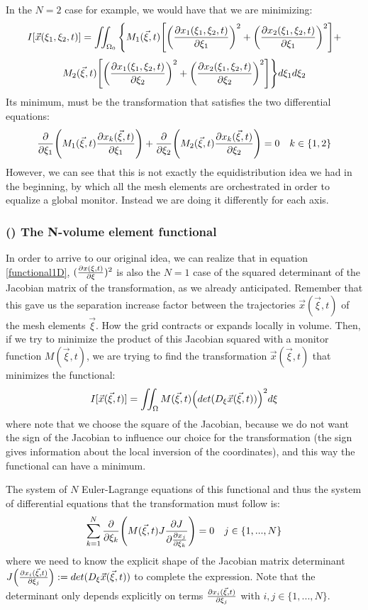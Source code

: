 \documentclass[11pt, a4paper]{article} %
\begin{document}
In the $N=2$ case for example, we would have that we are minimizing:
\begin{equation}
I[\vec{x}(\xi_1, \xi_2,t)]=\iint_{\Omega_0} \Bigg\{M_1(\vec{\xi},t) \qty[\qty(\pdv{x_1(\xi_1,\xi_2,t)}{\xi_1})^2+\qty(\pdv{x_2(\xi_1,\xi_2,t)}{\xi_1})^2] +
\end{equation}
$$
M_2(\vec{\xi},t) \qty[\qty(\pdv{x_1(\xi_1,\xi_2,t)}{\xi_2})^2+\qty(\pdv{x_2(\xi_1,\xi_2,t)}{\xi_2})^2]\Bigg\} d\xi_1d\xi_2
$$
Its minimum, must be the transformation that satisfies the two differential equations:
\begin{equation}
\pdv{}{\xi_1} \qty( M_1(\vec{\xi},t)\pdv{x_k(\vec{\xi},t)}{\xi_1} )+\pdv{}{\xi_2}\qty( M_2(\vec{\xi},t)\pdv{x_k(\vec{\xi},t)}{\xi_2} )=0 \quad k\in\{1,2\}
\end{equation}
However, we can see that this is not exactly the equidistribution idea we had in the beginning, by which all the mesh elements are orchestrated in order to equalize a global monitor. Instead we are doing it differently for each axis.

\subsubsection*{\bf (\textbeta) The N-volume element functional}
In order to arrive to our original idea, we can realize that in equation \eqref{functional1D}, $(\pdv{x(\xi,t)}{\xi})^2$ is also the $N=1$ case of the squared determinant of the Jacobian matrix of the transformation, as we already anticipated. Remember that this gave us the separation increase factor between the trajectories $\vec{x}(\vec{\xi},t)$ of the mesh elements $\vec{\xi}$. How the grid contracts or expands locally in volume. Then, if we try to minimize the product of this Jacobian squared with a monitor function $M(\vec{\xi},t)$, we are trying to find the transformation $\vec{x}(\vec{\xi},t)$ that minimizes the functional:
\begin{equation}
I[\vec{x}(\vec{\xi},t)]=\iint_\Omega M(\vec{\xi},t) \qty(det(D_\xi \vec{x}(\vec{\xi},t)))^2 d\xi
\end{equation}
where note that we choose the square of the Jacobian, because we do not want the sign of the Jacobian to influence our choice for the transformation (the sign gives information about the local inversion of the coordinates), and this way the functional can have a minimum.

The system of $N$ Euler-Lagrange equations of this functional and thus the  system of differential equations that the transformation must follow is:
\begin{equation}
\sum_{k=1}^N \pdv{}{\xi_k} \qty( M(\vec{\xi},t) J \pdv{J }{\pdv{x_j}{\xi_k}} )=0\quad j\in\{1,...,N\}
\end{equation}
where we need to know the explicit shape of the Jacobian matrix determinant $J\qty(\pdv{x_i(\vec{\xi},t)}{\xi_j}):=det(D_\xi \vec{x}(\vec{\xi},t))$ to complete the expression. Note that the determinant only depends explicitly on terms $\pdv{x_i(\vec{\xi},t)}{\xi_j}$ with $i,j\in\{1,...,N\}$.
\end{document}

